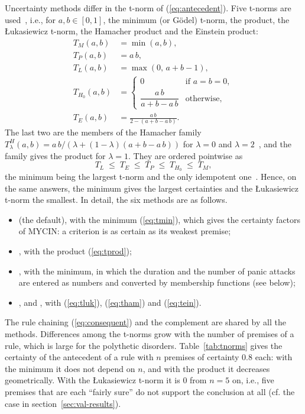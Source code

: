 Uncertainty methods differ in the t-norm of (\ref{eq:antecedent}). Five
t-norms are used~\cite{klement,hajek}, i.e., for $a, b \in [0,1]$, the minimum
(or G\"odel) t-norm, the product, the \L{}ukasiewicz t-norm, the Hamacher
product and the Einstein product:
\begin{align}
T_{M}(a,b) &= \min(a,b), \label{eq:tmin}\\
T_{P}(a,b) &= a\,b, \label{eq:tprod}\\
T_{L}(a,b) &= \max(0,\, a+b-1), \label{eq:tluk}\\
T_{H_0}(a,b) &=
\begin{cases}
0 & \text{if } a=b=0,\\[2pt]
\dfrac{a\,b}{a+b-a\,b} & \text{otherwise,}
\end{cases} \label{eq:tham}\\
T_{E}(a,b) &= \frac{a\,b}{2-(a+b-a\,b)} . \label{eq:tein}
\end{align}
The last two are the members of the Hamacher family
$T^{H}_{\lambda}(a,b) = a\,b / (\lambda + (1-\lambda)(a+b-a\,b))$ for $\lambda=0$
and $\lambda=2$~\cite{hamacher}, and the family gives the product for
$\lambda=1$. They are ordered pointwise as
\begin{equation}\label{eq:order}
T_{L} \;\le\; T_{E} \;\le\; T_{P} \;\le\; T_{H_0} \;\le\; T_{M} ,
\end{equation}
the minimum being the largest t-norm and the only idempotent one~\cite{klement}.
Hence, on the same answers, the minimum gives the largest certainties and the
\L{}ukasiewicz t-norm the smallest. In detail, the six methods are as follows.
\begin{itemize}
  \item {} (the default), with the minimum (\ref{eq:tmin}), which gives
  the certainty factors of MYCIN: a criterion is as certain as its weakest
  premise;
  \item {}, with the product (\ref{eq:tprod});
  \item {}, with the minimum, in which the duration and
  the number of panic attacks are entered as numbers and converted by
  membership functions (see below);
  \item {},  and , with
  (\ref{eq:tluk}), (\ref{eq:tham}) and (\ref{eq:tein}).
\end{itemize}
The rule chaining (\ref{eq:consequent}) and the complement are shared by all
the methods. Differences among the t-norms grow with the number of premises
of a rule, which is large for the polythetic disorders. Table~\ref{tab:tnorms}
gives the certainty of the antecedent of a rule with $n$ premises of certainty
$0.8$ each: with the minimum it does not depend on $n$, and with the product it
decreases geometrically. With the \L{}ukasiewicz t-norm it is $0$ from $n=5$
on, i.e., five premises that are each ``fairly sure'' do not support the
conclusion at all (cf. the case  in
section~\ref{sec:val-results}).

